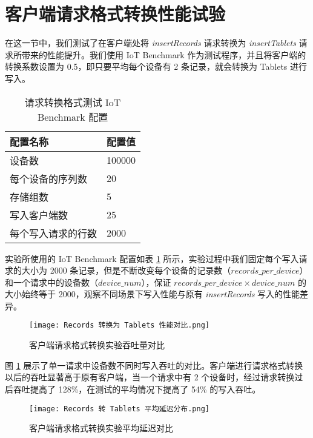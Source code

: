 \section{客户端请求格式转换性能试验}
在这一节中，我们测试了在客户端处将 \emph{insertRecords} 请求转换为 \emph{insertTablets} 请求所带来的性能提升。我们使用 IoT Benchmark 作为测试程序，并且将客户端的转换系数设置为 0.5，即只要平均每个设备有 2 条记录，就会转换为 Tablets 进行写入。
\begin{table}
  \centering
  \caption{请求转换格式测试 IoT Benchmark 配置}
  \begin{tabular}{ll}
    \toprule
    配置名称 & 配置值 \\
    \midrule 
    设备数 & 100000 \\
    每个设备的序列数 & 20 \\
    存储组数 & 5 \\
    写入客户端数 & 25 \\
    每个写入请求的行数 & 2000 \\
    \bottomrule
  \end{tabular}
  \label{tabular:test-req-format-iot-benchmark-config}
\end{table}
实验所使用的 IoT Benchmark 配置如表 \ref{tabular:test-req-format-iot-benchmark-config} 所示，实验过程中我们固定每个写入请求的大小为 2000 条记录，但是不断改变每个设备的记录数（$records\_per\_device$）和一个请求中的设备数（$device\_num$），保证 $records\_per\_device \times device\_num$ 的大小始终等于 2000，观察不同场景下写入性能与原有 \emph{insertRecords} 写入的性能差异。

\begin{figure}
  \centering
  \texttt{[image: Records 转换为 Tablets 性能对比.png]}
  \caption{客户端请求格式转换实验吞吐量对比}
  \label{fig:records-to-tablets-performance-throughput}
\end{figure}

图 \ref{fig:records-to-tablets-performance-throughput} 展示了单一请求中设备数不同时写入吞吐的对比。客户端进行请求格式转换以后的吞吐显著高于原有客户端，当一个请求中有 2 个设备时，经过请求转换过后吞吐提高了 128\%，在测试的平均情况下提高了 54\% 的写入吞吐。

\begin{figure}
  \centering
  \texttt{[image: Records 转 Tablets 平均延迟分布.png]}
  \caption{客户端请求格式转换实验平均延迟对比}
  \label{fig:records-to-tablets-performance-avg-latency}
\end{figure}

